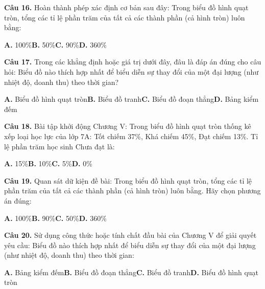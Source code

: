 \documentclass[11pt,a4paper]{article}
\begin{document}
\textbf{\color{primary} Câu 16.} Hoàn thành phép xác định cơ bản sau đây: Trong biểu đồ hình quạt tròn, tổng các tỉ lệ phần trăm của tất cả các thành phần (cả hình tròn) luôn bằng:\par
\hspace*{1.5em}\textbf{A.} 100\%\quad\quad \textbf{B.} 50\%\quad\quad \textbf{C.} 90\%\quad\quad \textbf{D.} 360\%\par\vspace{2pt}
\textbf{\color{primary} Câu 17.} Trong các khẳng định hoặc giá trị dưới đây, đâu là đáp án đúng cho câu hỏi: Biểu đồ nào thích hợp nhất để biểu diễn sự thay đổi của một đại lượng (như nhiệt độ, doanh thu) theo thời gian?\par
\hspace*{1.5em}\textbf{A.} Biểu đồ hình quạt tròn\quad\quad \textbf{B.} Biểu đồ tranh\quad\quad \textbf{C.} Biểu đồ đoạn thẳng\quad\quad \textbf{D.} Bảng kiểm đếm\par\vspace{2pt}
\textbf{\color{primary} Câu 18.} Bài tập khởi động Chương V: Trong biểu đồ hình quạt tròn thống kê xếp loại học lực của lớp 7A: Tốt chiếm 37\%, Khá chiếm 45\%, Đạt chiếm 13\%. Tỉ lệ phần trăm học sinh Chưa đạt là:\par
\hspace*{1.5em}\textbf{A.} 15\%\quad\quad \textbf{B.} 10\%\quad\quad \textbf{C.} 5\%\quad\quad \textbf{D.} 0\%\par\vspace{2pt}
\textbf{\color{primary} Câu 19.} Quan sát dữ kiện đề bài: Trong biểu đồ hình quạt tròn, tổng các tỉ lệ phần trăm của tất cả các thành phần (cả hình tròn) luôn bằng. Hãy chọn phương án đúng:\par
\hspace*{1.5em}\textbf{A.} 100\%\quad\quad \textbf{B.} 90\%\quad\quad \textbf{C.} 50\%\quad\quad \textbf{D.} 360\%\par\vspace{2pt}
\textbf{\color{primary} Câu 20.} Sử dụng công thức hoặc tính chất đầu bài của Chương V để giải quyết yêu cầu: Biểu đồ nào thích hợp nhất để biểu diễn sự thay đổi của một đại lượng (như nhiệt độ, doanh thu) theo thời gian:\par
\hspace*{1.5em}\textbf{A.} Bảng kiểm đếm\quad\quad \textbf{B.} Biểu đồ đoạn thẳng\quad\quad \textbf{C.} Biểu đồ tranh\quad\quad \textbf{D.} Biểu đồ hình quạt tròn\par\vspace{2pt}
\end{document}
